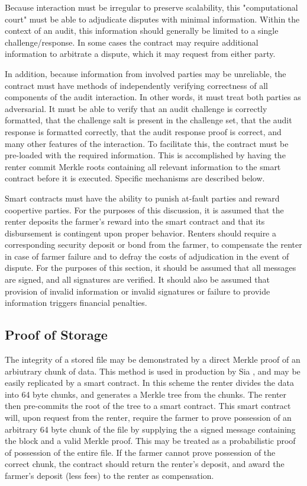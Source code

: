 \documentclass[a4paper,10pt]{article}
\begin{document}
Because interaction must be irregular to preserve scalability, this "computational court" must be able to adjudicate disputes with minimal information. Within the context of an audit, this information should generally be limited to a single challenge/response. In some cases the contract may require additional information to arbitrate a dispute, which it may request from either party.

In addition, because information from involved parties may be unreliable, the contract must have methods of independently verifying correctness of all components of the audit interaction. In other words, it must treat both parties as adversarial. It must be able to verify that an audit challenge is correctly formatted, that the challenge salt is present in the challenge set, that the audit response is formatted correctly, that the audit response proof is correct, and many other features of the interaction. To facilitate this, the contract must be pre-loaded with the required information. This is accomplished by having the renter commit Merkle roots containing all relevant information to the smart contract before it is executed. Specific mechanisms are described below.

Smart contracts must have the ability to punish at-fault parties and reward coopertive parties. For the purposes of this discussion, it is assumed that the renter deposits the farmer's reward into the smart contract and that its disbursement is contingent upon proper behavior. Renters should require a corresponding security deposit or bond from the farmer, to compensate the renter in case of farmer failure and to defray the costs of adjudication in the event of dispute. For the purposes of this section, it should be assumed that all messages are signed, and all signatures are verified.  It should also be assumed that provision of invalid information or invalid signatures or failure to provide information triggers financial penalties.

\subsection{Proof of Storage}

The integrity of a stored file may be demonstrated by a direct Merkle proof of an arbiutrary chunk of data. This method is used in production by Sia \cite{32}, and may be easily replicated by a smart contract. In this scheme the renter divides the data into 64 byte chunks, and generates a Merkle tree from the chunks. The renter then pre-commits the root of the tree to a smart contract. This smart contract will, upon request from the renter, require the farmer to prove possession of an arbitrary 64 byte chunk of the file by supplying the a signed message containing the block and a valid Merkle proof. This may be treated as a probabilistic proof of possession of the entire file. If the farmer cannot prove possession of the correct chunk, the contract should return the renter's deposit, and award the farmer's deposit (less fees) to the renter as compensation.
\end{document}
